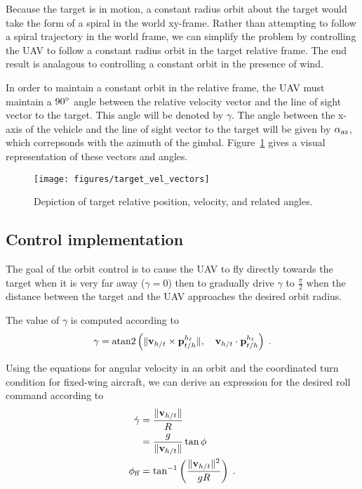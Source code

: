 Because the target is in motion, a constant radius orbit about the target would take the form of a spiral in the world xy-frame.
Rather than attempting to follow a spiral trajectory in the world frame, we can simplify the problem by controlling the UAV to follow a constant radius orbit in the target relative frame.
The end result is analagous to controlling a constant orbit in the presence of wind.

In order to maintain a constant orbit in the relative frame, the UAV must maintain a $90^\circ$ angle between the relative velocity vector and the line of sight vector to the target.
This angle will be denoted by $\gamma$.
The angle between the x-axis of the vehicle and the line of sight vector to the target will be given by $\alpha_\text{az}$, which correpsonds with the azimuth of the gimbal.
Figure~\ref{fig:target_relative_vectors} gives a visual representation of these vectors and angles.
\begin{figure}[hbt]
    \centering
    \texttt{[image: figures/target\_vel\_vectors]}
    \caption{Depiction of target relative position, velocity, and related angles.}
    \label{fig:target_relative_vectors}
\end{figure}

\subsection{Control implementation}

The goal of the orbit control is to cause the UAV to fly directly towards the target when it is very far away ($\gamma = 0$) then to gradually drive $\gamma$ to $\frac{\pi}{2}$ when the distance between the target and the UAV approaches the desired orbit radius.

The value of $\gamma$ is computed according to
\begin{equation}
    \gamma = \text{atan2}\left(\lVert{\mathbf{v}}_{h/t}\times{\mathbf{p}}_{t/h}^{h_\ell}\rVert, \hspace{1em}{\mathbf{v}}_{h/t}\cdot{\mathbf{p}}_{t/h}^{h_\ell}\right)\;.
\end{equation}

Using the equations for angular velocity in an orbit and the coordinated turn condition for fixed-wing aircraft, we can derive an expression for the desired roll command according to
\begin{align}
    \dot{\gamma} &= \frac{\lVert{\mathbf{v}}_{h/t}\rVert}{R} \\
    &= \frac{g}{\lVert{\mathbf{v}}_{h/t}\rVert}\tan\phi\\
    \label{eq:phi_ff}
    {\phi}_\text{ff} &= \tan^{-1}\left(\frac{\lVert{\mathbf{v}}_{h/t}\rVert^2}{gR}\right)\;.
\end{align}

